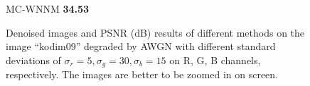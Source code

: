 \begin{figure}
{\begin{minipage}[t]{0.19\textwidth}
{\footnotesize MC-WNNM \textbf{34.53}}
\end{minipage}
}
    \caption{Denoised images and PSNR (dB) results of different methods on the image ``kodim09'' degraded by AWGN with different standard deviations of $\sigma_{r}=5, \sigma_{g}=30, \sigma_{b}=15$ on R, G, B channels, respectively. The images are better to be zoomed in on screen.}
    \label{fig4-6}
\end{figure}


\begin{figure}
    \centering
{}
\end{figure}
